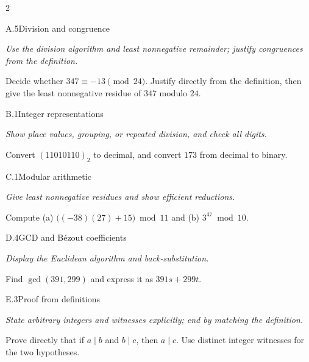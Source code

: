 \documentclass[9pt]{extarticle}
\begin{document}
\begin{multicols}{2}
\begin{CoreProblem}{A.5}{Division and congruence}
{\scriptsize\textit{Use the division algorithm and least nonnegative remainder; justify congruences from the definition.}\par}
Decide whether $347\equiv-13\pmod{24}$. Justify directly from the definition,
then give the least nonnegative residue of $347$ modulo $24$.
\end{CoreProblem}
\begin{CoreProblem}{B.1}{Integer representations}
{\scriptsize\textit{Show place values, grouping, or repeated division, and check all digits.}\par}
Convert $(11010110)_2$ to decimal, and convert $173$ from decimal to binary.
\end{CoreProblem}
\begin{CoreProblem}{C.1}{Modular arithmetic}
{\scriptsize\textit{Give least nonnegative residues and show efficient reductions.}\par}
Compute (a) $\bigl((-38)(27)+15\bigr)\bmod11$ and
(b) $3^{47}\bmod10$.
\end{CoreProblem}
\columnbreak
\begin{CoreProblem}{D.4}{GCD and B\'ezout coefficients}
{\scriptsize\textit{Display the Euclidean algorithm and back-substitution.}\par}
Find $\gcd(391,299)$ and express it as $391s+299t$.
\end{CoreProblem}
\begin{CoreProblem}{E.3}{Proof from definitions}
{\scriptsize\textit{State arbitrary integers and witnesses explicitly; end by matching the definition.}\par}
Prove directly that if $a\mid b$ and $b\mid c$, then $a\mid c$. Use distinct
integer witnesses for the two hypotheses.
\end{CoreProblem}
\end{multicols}
\CoreWorkArea
\FormBreak
{}
\end{document}
